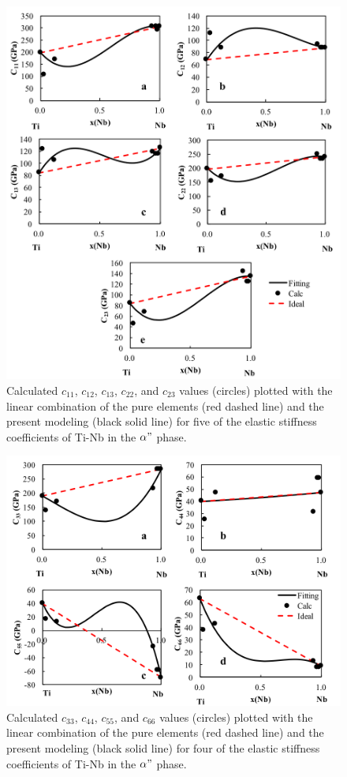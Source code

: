 \pagebreak
\begin{figure}[H]
	\centering
	\includegraphics[width=\textwidth]{Chapter-7/Figures/adpe1.png}
	\caption{Calculated $c_{11}$, $c_{12}$, $c_{13}$, $c_{22}$, and  $c_{23}$ values (circles) plotted with the linear combination of the pure elements (red dashed line) and the present modeling (black solid line) for five of the elastic stiffness coefficients of Ti-Nb in the $\alpha"$ phase.}
	\label{Ch7-figure:adpelas1}
\end{figure}

\pagebreak
\begin{figure}[H]
	\centering
	\includegraphics[width=\textwidth]{Chapter-7/Figures/adpe2.png}
	\caption{Calculated $c_{33}$, $c_{44}$, $c_{55}$, and $c_{66}$ values (circles) plotted with the linear combination of the pure elements (red dashed line) and the present modeling (black solid line) for four of the elastic stiffness coefficients of Ti-Nb in the $\alpha"$ phase.}
	\label{Ch7-figure:adpelas2}
\end{figure}

